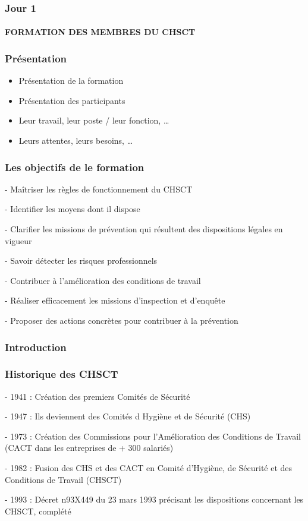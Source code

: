 \documentclass{beamer}
\begin{document}

\begin{frame}
\frametitle{Jour 1}
\framesubtitle{FORMATION DES MEMBRES DU CHSCT}
\end{frame}


\begin{frame}
\frametitle{Présentation}
	\begin{itemize}
		\item Présentation de la formation
		\item Présentation des participants
        \item Leur travail, leur poste / leur fonction, …
        \item Leurs attentes, leurs besoins, …
	\end{itemize}
\end{frame}


\begin{frame}
\frametitle{Les objectifs de le formation}


- Maîtriser les règles de fonctionnement du CHSCT

- Identifier les moyens dont il dispose

- Clarifier les missions de prévention qui résultent des dispositions légales en vigueur

- Savoir détecter les risques professionnels

- Contribuer à l’amélioration des conditions de travail

- Réaliser efficacement les missions d’inspection et d’enquête

- Proposer des actions concrètes pour contribuer à la prévention

\end{frame}  


\begin{frame}
\frametitle{Introduction}
\end{frame} 


\begin{frame}
\frametitle{Historique des CHSCT}
- 1941 : Création des premiers Comités de Sécurité 

- 1947 : Ils deviennent des Comités d Hygiène et de Sécurité (CHS)

- 1973 : Création des Commissions pour l'Amélioration des Conditions  de Travail (CACT dans les entreprises de + 300 salariés)

- 1982 : Fusion des CHS et des CACT en Comité d'Hygiène, de Sécurité et des Conditions de Travail (CHSCT) 

- 1993 : Décret n93X449 du 23 mars 1993 précisant les dispositions concernant les CHSCT, complété
\end{frame} 
\end{document}
